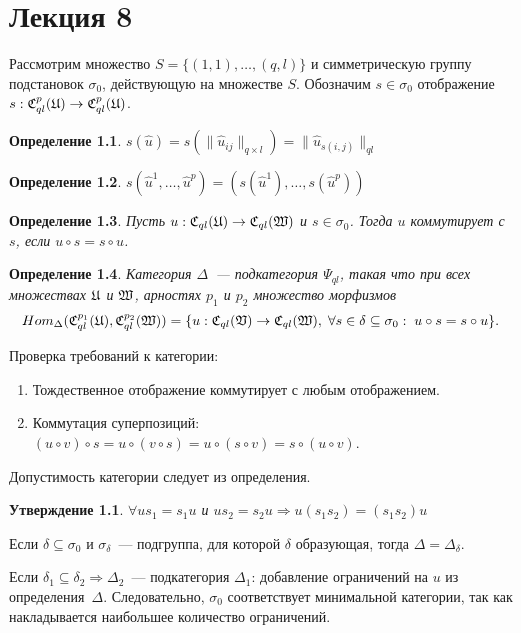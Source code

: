 \documentclass[a4paper, 12pt]{report}
\newtheorem{definition}{Определение}[chapter]
\newtheorem{St}{Утверждение}[chapter]
\begin{document}
\chapter{Лекция 8}
Рассмотрим множество $S = \{ (1, 1), \ldots, (q,l) \}$ и симметрическую группу подстановок $\sigma_0$, действующую на множестве $S$. Обозначим $s \in \sigma_0$ отображение $s: \mathfrak{C}_{ql}^p(\mathfrak{U}) \rightarrow \mathfrak{C}_{ql}^p(\mathfrak{U})$.

\begin{definition}
$s(\hat{u}) = s(\| \hat{u}_{ij} \|_{q\times l}) = \|\hat{u}_{s(i, j)} \|_{ql}$
\end{definition}

\begin{definition}
$s(\hat{u}^1, \ldots, \hat{u}^p) = (s(\hat{u}^1), \ldots, s(\hat{u}^p))$
\end{definition}

\begin{definition}
Пусть $u: \mathfrak{C}_{ql}(\mathfrak{U}) \rightarrow \mathfrak{C}_{ql}(\mathfrak{W})$ и $s \in \sigma_0$. Тогда $u$ коммутирует с $s$, если $u \circ s = s \circ u$.
\end{definition}

\begin{definition}
Категория $\Delta$~--- подкатегория $\Psi_{ql}$, такая что при всех множествах $\mathfrak{U}$ и $\mathfrak{W}$, арностях $p_1$ и $p_2$ множество морфизмов
\[
Hom_{\Delta}(\mathfrak{C}_{ql}^{p_1}(\mathfrak{U}), \mathfrak{C}_{ql}^{p_2}(\mathfrak{W})) = \{ u: \mathfrak{C}_{ql}(\mathfrak{V}) \rightarrow \mathfrak{C}_{ql}(\mathfrak{W}), \; \forall s \in \delta \subseteq \sigma_0: \; u \circ s = s \circ u \}.
\]
\end{definition}

Проверка требований к категории:
\begin{enumerate}
\item Тождественное отображение коммутирует с любым отображением.
\item Коммутация суперпозиций: $(u \circ v) \circ s = u \circ (v \circ s) = u \circ (s \circ v) = s \circ (u \circ v)$.
\end{enumerate}
Допустимость категории следует из определения.

\begin{St}
$\forall us_1 = s_1u$ {\rm и} $us_2 = s_2u \Rightarrow u(s_1s_2) = (s_1s_2)u$
\end{St}

Если $\delta \subseteq \sigma_0$ и $\sigma_{\delta}$~--- подгруппа, для которой $\delta$ образующая, тогда $\Delta = \Delta_{\delta}$.

Если $\delta_1 \subseteq \delta_2 \Rightarrow \Delta_2$~--- подкатегория $\Delta_1$: добавление ограничений на $u$ из определения~$\Delta$. Следовательно, $\sigma_0$ соответствует минимальной категории, так как накладывается наибольшее количество ограничений.
\end{document}
